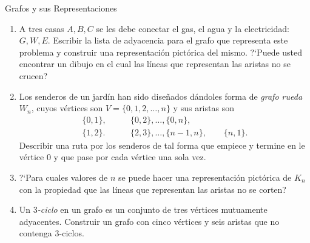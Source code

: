 \begin{section}{Grafos y sus Representaciones}
\begin{enumerate}[1)]
\item A tres casas $A,B,C$ se les debe conectar el gas, el agua y la electricidad: $G,W,E$.
Escribir la lista de adyacencia para el grafo que representa este
problema y construir una representación pictórica del mismo.
?`Puede usted encontrar un dibujo en el cual las líneas que
representan las aristas no se crucen?
\item Los senderos de un jardín han sido diseñados dándoles forma de {\em grafo rueda}
$W_n$, cuyos vértices son $V=\{0,1,2,\ldots,n\}$ y sus aristas son
$$
\begin{aligned}
\{0,1\},\qquad &\{0,2\},\ldots,\{0,n\}, \\
\{1,2\}.\qquad &\{2,3\},\ldots,\{n-1,n\},\qquad \{n,1\}.
\end{aligned}
$$
Describir una ruta por los senderos de tal forma que empiece y
termine en le vértice $0$ y que pase por cada vértice una sola vez.
\item  ?`Para cuales valores de $n$ se puede hacer una representación pictórica
de $K_n$ con la propiedad que las líneas que representan las aristas no se corten?
\item Un {\it {$3$-ciclo}} en un grafo es un conjunto de tres vértices mutuamente adyacentes.
Construir un grafo con cinco vértices y seis aristas que no
contenga $3$-ciclos.
\end{enumerate}

\end{section}



